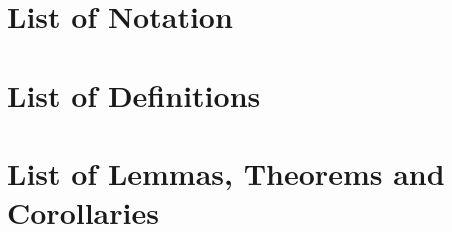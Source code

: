 
\section{List of Notation}

\section{List of Definitions}

\section{List of Lemmas, Theorems and Corollaries}
